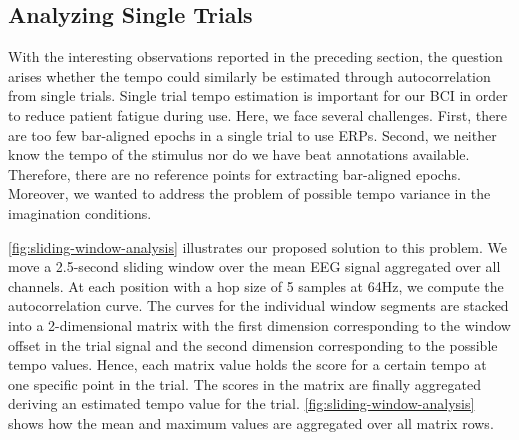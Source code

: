

\subsection*{Analyzing Single Trials}

With the interesting observations reported in the preceding section, the question arises whether the tempo could similarly be estimated through autocorrelation from single trials. 
Single trial tempo estimation is important for our BCI in order to reduce patient fatigue during use.
Here, we face several challenges. 
First, there are too few bar-aligned epochs in a single trial to use ERPs.
Second, we neither know the tempo of the stimulus nor do we have beat annotations available.
Therefore, there are no reference points for extracting bar-aligned epochs.
Moreover, we wanted to address the problem of possible tempo variance in the imagination conditions.

\autoref{fig:sliding-window-analysis} illustrates our proposed solution to this problem.
We move a 2.5-second sliding window over the mean EEG signal aggregated over all channels.
At each position with a hop size of 5 samples at 64Hz, we compute the autocorrelation curve.
The curves for the individual window segments are stacked into a 2-dimensional matrix with the first dimension corresponding to the window offset in the trial signal and the second dimension corresponding to the possible tempo values.
Hence, each matrix value holds the score for a certain tempo at one specific point in the trial.
The scores in the matrix are finally aggregated deriving an estimated tempo value for the trial.
\autoref{fig:sliding-window-analysis} shows how the mean and maximum values are aggregated over all matrix rows.


